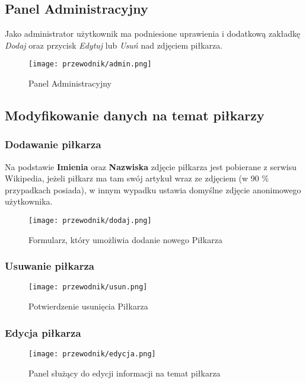         \pagebreak

        \subsection{Panel Administracyjny}
            Jako administrator użytkownik ma podniesione uprawienia i dodatkową zakładkę \textit{Dodaj} oraz przycisk \textit{Edytuj} lub \textit{Usuń} nad zdjęciem piłkarza.

            \begin{figure}[!htb]
                \centering
                \texttt{[image: przewodnik/admin.png]}
                \caption{Panel Administracyjny}                
            \end{figure}

        \subsection{Modyfikowanie danych na temat piłkarzy}
                \subsubsection{Dodawanie piłkarza}
                 Na podstawie \textbf{Imienia} oraz \textbf{Nazwiska} zdjęcie piłkarza jest pobierane z serwisu Wikipedia, jeżeli piłkarz ma tam swój artykuł wraz ze zdjęciem (w 90 \% przypadkach posiada), w innym wypadku ustawia domyślne zdjęcie anonimowego użytkownika. 

                    \begin{figure}[!htb]
                        \centering
                        \texttt{[image: przewodnik/dodaj.png]}
                        \caption{Formularz, który umożliwia dodanie nowego Piłkarza}                
                    \end{figure}
    
                \subsubsection{Usuwanie piłkarza}
                    \begin{figure}[!htb]
                        \centering
                        \texttt{[image: przewodnik/usun.png]}
                        \caption{Potwierdzenie usunięcia Piłkarza}                
                    \end{figure}

                \subsubsection{Edycja piłkarza}

                    \begin{figure}[!htb]
                        \centering
                        \texttt{[image: przewodnik/edycja.png]}
                        \caption{Panel służący do edycji informacji na temat piłkarza}                
                    \end{figure}
 